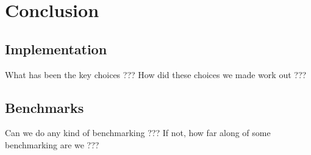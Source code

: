 
\chapter{Conclusion}


\section{Implementation}

What has been the key choices ??? How did these choices we made work out ???

\section{Benchmarks}

Can we do any kind of benchmarking ??? If not, how far along of some 
benchmarking are we ???

